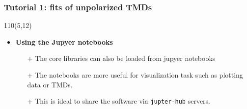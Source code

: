 \begin{frame}
\frametitle{\textbf{Tutorial 1: fits of unpolarized TMDs}}
\begin{textblock}{110}(5,12) 

\begin{itemize}
\item \textbf{Using the Jupyer notebooks}
  \begin{itemize}
  \item[+] The core libraries can also be loaded from jupyer notebooks
  \item[+] The notebooks are more useful for visualization task
           such as plotting data or TMDs. 
  \item[+] This is ideal to share the software via \texttt{jupter-hub}
           servers. 
  \end{itemize}

\end{itemize}

\end{textblock}
\end{frame}























